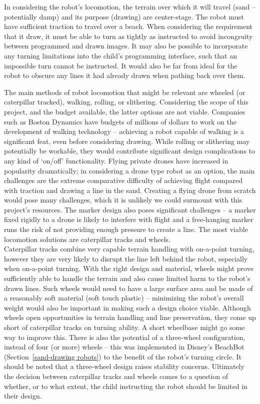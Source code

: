     In considering the robot's locomotion, the terrain over which it will travel (sand -- potentially damp) and its purpose (drawing) are center-stage. The robot must have sufficient traction to travel over a beach. When considering the requirement that it draw, it must be able to turn as tightly as instructed to avoid incongruity between programmed and drawn images. It may also be possible to incorporate any turning limitations into the child's programming interface, such that an impossible turn cannot be instructed. It would also be far from ideal for the robot to obscure any lines it had already drawn when pathing back over them.

    The main methods of robot locomotion that might be relevant are wheeled (or caterpillar tracked), walking, rolling, or slithering. Considering the scope of this project, and the budget available, the latter options are not viable. Companies such as Boston Dynamics have budgets of millions of dollars to work on the development of walking technology -- achieving a robot capable of walking is a significant feat, even before considering drawing. While rolling or slithering may potentially be workable, they would contribute significant design complications to any kind of `on/off' functionality. Flying private drones have increased in popularity dramatically; in considering a drone type robot as an option, the main challenges are the extreme comparative difficulty of achieving flight compared with traction and drawing a line in the sand. Creating a flying drone from scratch would pose many challenges, which it is unlikely we could surmount with this project's resources. The marker design also poses significant challenges -- a marker fixed rigidly to a drone is likely to interfere with flight and a free-hanging marker runs the risk of not providing enough pressure to create a line. The most viable locomotion solutions are caterpillar tracks and wheels.\\
    Caterpillar tracks combine very capable terrain handling with on-a-point turning, however they are very likely to disrupt the line left behind the robot, especially when on-a-point turning.  With the right design and material, wheels might prove sufficiently able to handle the terrain and also cause limited harm to the robot's drawn lines. Such wheels would need to have a large surface area and be made of a reasonably soft material (\eg soft touch plastic) -- minimizing the robot's overall weight would also be important in making such a design choice viable. Although wheels open opportunities in terrain handling and line preservation, they come up short of caterpillar tracks on turning ability. A short wheelbase might go some way to improve this. There is also the potential of a three-wheel configuration, instead of four (or more) wheels -- this was implemented in Disney's BeachBot (Section~\ref{sand-drawing robots}) to the benefit of the robot’s turning circle. It should be noted that a three-wheel design raises stability concerns. Ultimately the decision between caterpillar tracks and wheels comes to a question of whether, or to what extent, the child instructing the robot should be limited in their design.


